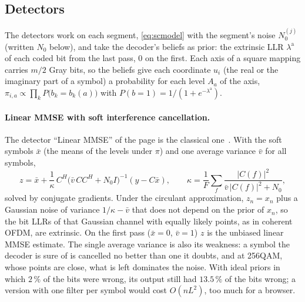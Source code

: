 \documentclass[11pt,a4paper]{article}
\theoremstyle{remark}
\begin{document}
\subsection{Detectors}
\label{sec:scdet}
The detectors work on each segment, \cref{eq:scmodel} with the segment's noise $N_0^{(j)}$ (written $N_0$ below), and take the decoder's beliefs as prior: the extrinsic LLR $\lambda^{\mathrm a}$ of each coded bit from the last pass, 0 on the first. Each axis of a square mapping carries $m/2$ Gray bits, so the beliefs give each coordinate $u_i$ (the real or the imaginary part of a symbol) a probability for each level $A_a$ of the axis, $\pi_{i,a} \propto \prod_k P\bigl(b_k = b_k(a)\bigr)$ with $P(b = 1) = 1/(1 + e^{-\lambda^{\mathrm a}})$.

\paragraph{Linear MMSE with soft interference cancellation.}
The detector ``Linear MMSE'' of the page is the classical one~\cite{tuchlertsp,tuchlertcom}. With the soft symbols $\bar x$ (the means of the levels under $\pi$) and one average variance $\bar v$ for all symbols,
\begin{equation}
z = \bar x + \frac{1}{\kappa}\, C^H \bigl(\bar v\, C C^H + N_0 I\bigr)^{-1} (y - C\bar x), \qquad \kappa = \frac1F \sum_f \frac{|C(f)|^2}{\bar v\, |C(f)|^2 + N_0},
\end{equation}
solved by conjugate gradients. Under the circulant approximation, $z_n = x_n$ plus a Gaussian noise of variance $1/\kappa - \bar v$ that does not depend on the prior of $x_n$, so the bit LLRs of that Gaussian channel with equally likely points, as in coherent OFDM, are extrinsic. On the first pass ($\bar x = 0$, $\bar v = 1$) $z$ is the unbiased linear MMSE estimate. The single average variance is also its weakness: a symbol the decoder is sure of is cancelled no better than one it doubts, and at 256QAM, whose points are close, what is left dominates the noise. With ideal priors in which $2\,\%$ of the bits were wrong, its output still had $13.5\,\%$ of the bits wrong; a version with one filter per symbol would cost $O(nL^2)$, too much for a browser.
\end{document}
